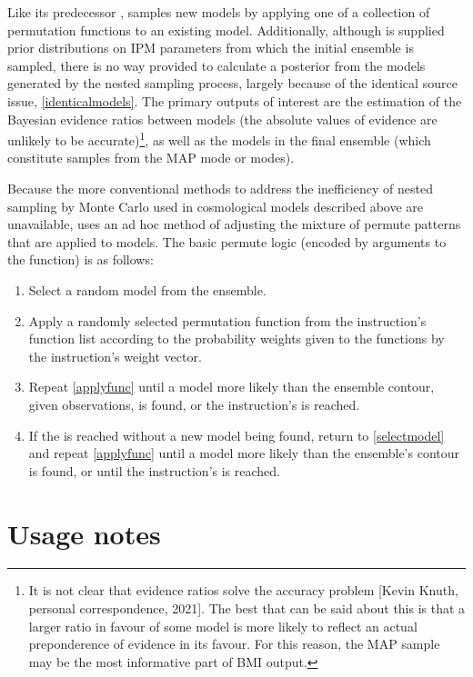 Like its predecessor ,  samples new models by applying one of a collection of permutation functions to an existing model. Additionally, although  is supplied prior distributions on IPM parameters from which the initial ensemble is sampled, there is no way provided to calculate a posterior from the models generated by the nested sampling process, largely because of the identical source issue, \ref{identicalmodels}. The primary outputs of interest are the estimation of the Bayesian evidence ratios between models (the absolute values of evidence are unlikely to be accurate)\footnote{It is not clear that evidence ratios solve the accuracy problem [Kevin Knuth, personal correspondence, 2021]. The best that can be said about this is that a larger ratio in favour of some model is more likely to reflect an actual preponderence of evidence in its favour. For this reason, the MAP sample may be the most informative part of BMI output.}, as well as the models in the final ensemble (which constitute samples from the MAP mode or modes).

Because the more conventional methods to address the inefficiency of nested sampling by Monte Carlo used in cosmological models described above are unavailable,  uses an ad hoc method of adjusting the mixture of permute patterns that are applied to models. The basic permute logic (encoded by  arguments to the  function) is as follows:

\begin{enumerate}
    \item\label{selectmodel} Select a random  model from the ensemble.
    \item\label{applyfunc} Apply a randomly selected permutation function from the instruction's function list according to the probability weights given to the functions by the instruction's weight vector.
    \item Repeat \ref{applyfunc} until a model more likely than the ensemble contour, given observations, is found, or the instruction's  is reached.
    \item If the  is reached without a new model being found, return to \ref{selectmodel} and repeat \ref{applyfunc} until a model more likely than the ensemble's contour is found, or until the instruction's  is reached.
\end{enumerate}

\section{Usage notes}
